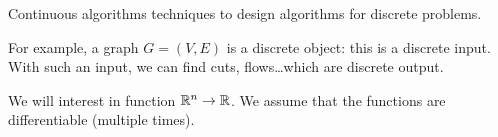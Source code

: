 Continuous algorithms techniques to design algorithms for discrete problems.

For example, a graph $G=(V,E)$  is a discrete object: this is a discrete input. With such an input, we can find cuts, flows\dots which are discrete output.

We will interest in function $\mathbb{R}^n \rightarrow \mathbb{R}$. We assume that the functions are differentiable (multiple times).

